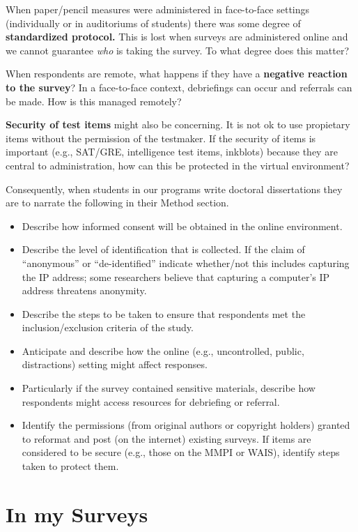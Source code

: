 \documentclass[
  english,
]{book}
\providecommand{\tightlist}{%
  \setlength{\itemsep}{0pt}\setlength{\parskip}{0pt}}
\begin{document}
When paper/pencil measures were administered in face-to-face settings (individually or in auditoriums of students) there was some degree of \textbf{standardized protocol.} This is lost when surveys are administered online and we cannot guarantee \emph{who} is taking the survey. To what degree does this matter?

When respondents are remote, what happens if they have a \textbf{negative reaction to the survey}? In a face-to-face context, debriefings can occur and referrals can be made. How is this managed remotely?

\textbf{Security of test items} might also be concerning. It is not ok to use propietary items without the permission of the testmaker. If the security of items is important (e.g., SAT/GRE, intelligence test items, inkblots) because they are central to administration, how can this be protected in the virtual environment?

Consequently, when students in our programs write doctoral dissertations they are to narrate the following in their Method section.

\begin{itemize}
\tightlist
\item
  Describe how informed consent will be obtained in the online environment.
\item
  Describe the level of identification that is collected. If the claim of ``anonymous'' or ``de-identified'' indicate whether/not this includes capturing the IP address; some researchers believe that capturing a computer's IP address threatens anonymity.
\item
  Describe the steps to be taken to ensure that respondents met the inclusion/exclusion criteria of the study.
\item
  Anticipate and describe how the online (e.g., uncontrolled, public, distractions) setting might affect responses.
\item
  Particularly if the survey contained sensitive materials, describe how respondents might access resources for debriefing or referral.
\item
  Identify the permissions (from original authors or copyright holders) granted to reformat and post (on the internet) existing surveys. If items are considered to be secure (e.g., those on the MMPI or WAIS), identify steps taken to protect them.
\end{itemize}

\hypertarget{in-my-surveys}{%
\section{In my Surveys}\label{in-my-surveys}}
\end{document}
